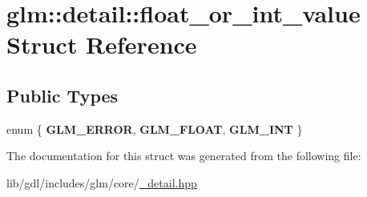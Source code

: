 \hypertarget{structglm_1_1detail_1_1float__or__int__value}{}\section{glm\+:\+:detail\+:\+:float\+\_\+or\+\_\+int\+\_\+value Struct Reference}
\label{structglm_1_1detail_1_1float__or__int__value}
\subsection*{Public Types}
\begin{DoxyCompactItemize}
\item 
\hypertarget{structglm_1_1detail_1_1float__or__int__value_aedfde4e6107469e39902665255d50a68}{}enum \{ {\bfseries G\+L\+M\+\_\+\+E\+R\+R\+O\+R}, 
{\bfseries G\+L\+M\+\_\+\+F\+L\+O\+A\+T}, 
{\bfseries G\+L\+M\+\_\+\+I\+N\+T}
 \}\label{structglm_1_1detail_1_1float__or__int__value_aedfde4e6107469e39902665255d50a68}

\end{DoxyCompactItemize}


The documentation for this struct was generated from the following file\+:\begin{DoxyCompactItemize}
\item 
lib/gdl/includes/glm/core/\hyperlink{__detail_8hpp}{\+\_\+detail.\+hpp}\end{DoxyCompactItemize}
